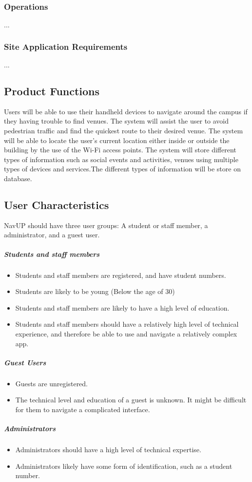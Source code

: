 \documentclass[english]{article}
\begin{document}
				\subsubsection{Operations}
						...

				\subsubsection{Site Application Requirements}
						...

		\subsection{Product Functions}
            Users will be able to use their handheld devices to navigate around the campus if they having trouble to find venues. The system will assist the user to avoid pedestrian traffic and find the quickest route to their desired venue. The system will be able to locate the user’s current location either inside or outside the building by the use of the Wi-Fi access points. The system will store different types of information such as social events and activities, venues using multiple types of devices and services.The different types of information will be store on database. 

		\subsection{User Characteristics}
				NavUP should have three user groups: A student or staff member, a administrator, and a guest user.
				\subparagraph{Students and staff members}
    				\begin{itemize}
    					\item Students and staff members are registered, and have student numbers.
    					\item Students are likely to be young (Below the age of 30)
    					\item Students and staff members are likely to have a high level of education.
    					\item Students and staff members should have a relatively high level of technical experience, and therefore be able to use and navigate a relatively complex app.
    				\end{itemize}
				\subparagraph{Guest Users}
    				\begin{itemize}
    					\item Guests are unregistered.
    					\item The technical level and education of a guest is unknown. It might be difficult for them to navigate a complicated interface.
    
    				\end{itemize}
				\subparagraph{Administrators}
    				\begin{itemize}
    					\item Administrators should have a high level of technical expertise.
    					\item Administrators likely have some form of identification, such as a student number.
    					
    				\end{itemize}
\end{document}
